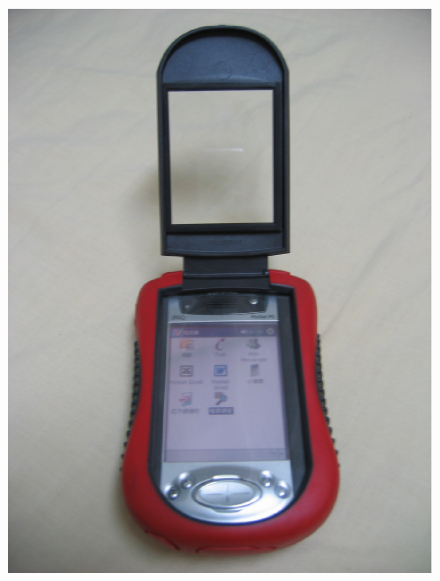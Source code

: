 \documentclass[12pt,a4paper]{article}
\begin{document}
\begin{CJK}{UTF8}{cwmu}
\begin{figure}[htbp]
\centering
\includegraphics[scale=0.35]{eps/shell_6.eps}%
\hspace{0.5cm}%

\end{figure}
\end{CJK}
\end{document}
